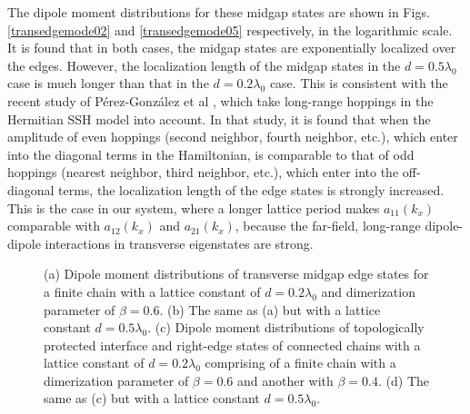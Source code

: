 \documentclass[aps,pra,reprint,groupedaddress,nofootinbib,longbibliography,showpacs]{revtex4-1}
\begin{document}
The dipole moment distributions for these midgap states are shown in Figs.\ref{transedgemode02} and \ref{transedgemode05} respectively, in the logarithmic scale. It is found that in both cases, the midgap states are exponentially localized over the edges. However, the localization length of the midgap states in the $d=0.5\lambda_0$ case is much longer than that in the $d=0.2\lambda_0$ case. This is consistent with the recent study of P\'erez-Gonz\'alez et al \cite{perezArxiv2018}, which take long-range hoppings in the Hermitian SSH model into account. In that study, it is found that when the amplitude of even hoppings (second neighbor, fourth neighbor, etc.), which enter into the diagonal terms in the Hamiltonian, is comparable to that of odd hoppings (nearest neighbor, third neighbor, etc.), which enter into the off-diagonal terms, the localization length of the edge states is strongly increased. This is the case in our system, where a longer lattice period makes $a_{11}(k_x)$ comparable with $a_{12}(k_x)$ and $a_{21}(k_x)$, because the far-field, long-range dipole-dipole interactions in transverse eigenstates are strong.
 
\begin{figure}[htbp]
	\centering
	\flushleft
{}
\hspace{0.01in}
\hspace{0.01in}
\hspace{0.01in}
	\caption{(a) Dipole moment distributions of transverse midgap edge states for a finite chain with a lattice constant of $d=0.2\lambda_0$ and dimerization parameter of $\beta=0.6$. (b) The same as (a) but with a lattice constant $d=0.5\lambda_0$. (c) Dipole moment distributions of topologically protected interface and right-edge states of connected chains with a lattice constant of $d=0.2\lambda_0$ comprising of a finite chain with a dimerization parameter of $\beta=0.6$ and another with $\beta=0.4$. (d) The same as (c) but with a lattice constant $d=0.5\lambda_0$.}
	
	\label{transfiniteband}
\end{figure}
\end{document}
